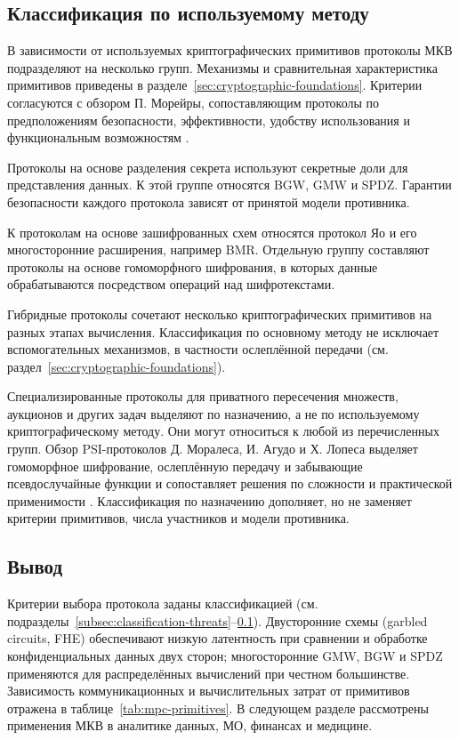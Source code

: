 \subsection{Классификация по используемому методу}
\label{subsec:classification-primitives}

В зависимости от используемых криптографических примитивов протоколы МКВ подразделяют на несколько групп. Механизмы и сравнительная характеристика примитивов приведены в разделе~\ref{sec:cryptographic-foundations}. Критерии согласуются с обзором П. Морейры, сопоставляющим протоколы по предположениям безопасности, эффективности, удобству использования и функциональным возможностям \cite{10}.

Протоколы на основе разделения секрета используют секретные доли для представления данных. К этой группе относятся BGW, GMW и SPDZ. Гарантии безопасности каждого протокола зависят от принятой модели противника.

К протоколам на основе зашифрованных схем относятся протокол Яо и его многосторонние расширения, например BMR. Отдельную группу составляют протоколы на основе гомоморфного шифрования, в которых данные обрабатываются посредством операций над шифротекстами.

Гибридные протоколы сочетают несколько криптографических примитивов на разных этапах вычисления. Классификация по основному методу не исключает вспомогательных механизмов, в частности ослеплённой передачи (см. раздел~\ref{sec:cryptographic-foundations}).

Специализированные протоколы для приватного пересечения множеств, аукционов и других задач выделяют по назначению, а не по используемому криптографическому методу. Они могут относиться к любой из перечисленных групп. Обзор PSI-протоколов Д. Моралеса, И. Агудо и Х. Лопеса выделяет гомоморфное шифрование, ослеплённую передачу и забывающие псевдослучайные функции и сопоставляет решения по сложности и практической применимости \cite{09}. Классификация по назначению дополняет, но не заменяет критерии примитивов, числа участников и модели противника.

\subsection{Вывод}

Критерии выбора протокола заданы классификацией (см. подразделы~\ref{subsec:classification-threats}--\ref{subsec:classification-primitives}). Двусторонние схемы (garbled circuits, FHE) обеспечивают низкую латентность при сравнении и обработке конфиденциальных данных двух сторон; многосторонние GMW, BGW и SPDZ применяются для распределённых вычислений при честном большинстве. Зависимость коммуникационных и вычислительных затрат от примитивов отражена в таблице~\ref{tab:mpc-primitives}. В следующем разделе рассмотрены применения МКВ в аналитике данных, МО, финансах и медицине.
